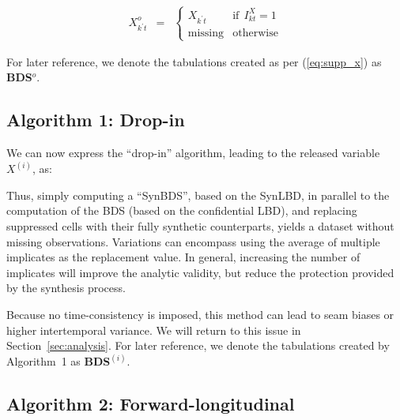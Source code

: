 \begin{eqnarray}
\label{eq:supp_x}
X_{k^\prime t}^o &=& \left \lbrace 
\begin{array}{rl}
X_{k^\prime t} &\mbox{if}~~  I_{kt}^X = 1 \\
\mbox{missing} &\mbox{otherwise}
\end{array} \right .
\end{eqnarray}

For later 
reference, we denote the tabulations created as per (\ref{eq:supp_x}) as \textbf{BDS$^o$}.

\subsection{Algorithm 1: Drop-in}

We can now express the ``drop-in'' algorithm, leading to the released variable $X^{(i)}$, as:
\begin{algorithm}
\begin{algorithmic}
\Else
\EndIf
\end{algorithmic}
\end{algorithm}
Thus, simply computing a ``SynBDS'', based on the \ac{SynLBD}, in parallel to the computation 
of the \ac{BDS} (based on the confidential \ac{LBD}), and replacing suppressed cells with their 
fully synthetic counterparts, yields a dataset without missing observations. Variations can 
encompass using the average of multiple implicates  as the replacement value. In 
general, increasing the number of implicates will improve the analytic validity, but reduce the 
protection provided by the synthesis process. 

Because no time-consistency is imposed, this method can lead to seam biases or higher 
intertemporal variance. We will return to this issue in Section~\ref{sec:analysis}. For later 
reference, we denote the tabulations created by Algorithm~1 as \textbf{BDS$^{(i)}$}.

\subsection{Algorithm 2: Forward-longitudinal}

